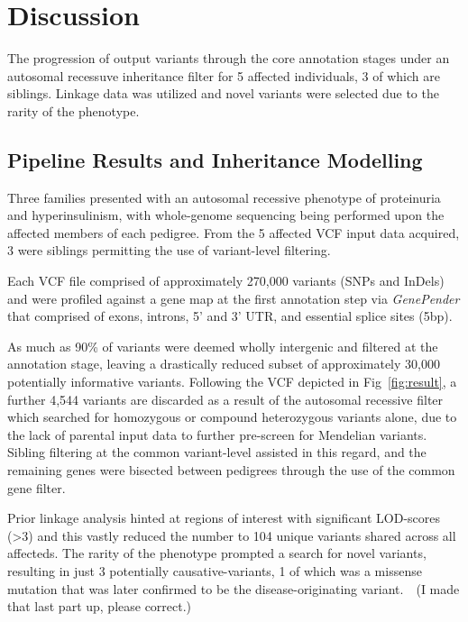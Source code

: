 \section{Discussion}

{The progression of output variants through the core annotation stages under an autosomal recessuve inheritance filter for 5 affected individuals, 3 of which are siblings. Linkage data was utilized and novel variants were selected due to the rarity of the phenotype.}


\subsection{Pipeline Results and Inheritance Modelling}

Three families presented with an autosomal recessive phenotype of proteinuria and hyperinsulinism, with whole-genome sequencing being performed upon the affected members of each pedigree. From the 5 affected VCF input data acquired, 3 were siblings permitting the use of variant-level filtering.

Each VCF file comprised of approximately 270,000 variants (SNPs and InDels) and were profiled against a gene map at the first annotation step via \textit{GenePender} that comprised of exons, introns, 5' and 3' UTR, and essential splice sites (5bp).

As much as 90\% of variants were deemed wholly intergenic and filtered at the annotation stage, leaving a drastically reduced subset of approximately 30,000 potentially informative variants. Following the VCF depicted in Fig~\ref{fig:result}, a further 4,544 variants are discarded as a result of the autosomal recessive filter which searched for homozygous or compound heterozygous variants alone, due to the lack of parental input data to further pre-screen for Mendelian variants. Sibling filtering at the common variant-level assisted in this regard, and the remaining genes were bisected between pedigrees through the use of the common gene filter.

Prior linkage analysis hinted at regions of interest with significant LOD-scores (>3) and this vastly reduced the number to 104 unique variants shared across all affecteds. The rarity of the phenotype prompted a search for novel variants, resulting in just 3 potentially causative-variants, 1 of which was a missense mutation that was later confirmed to be the disease-originating variant.\
\
(I made that last part up, please correct.)


